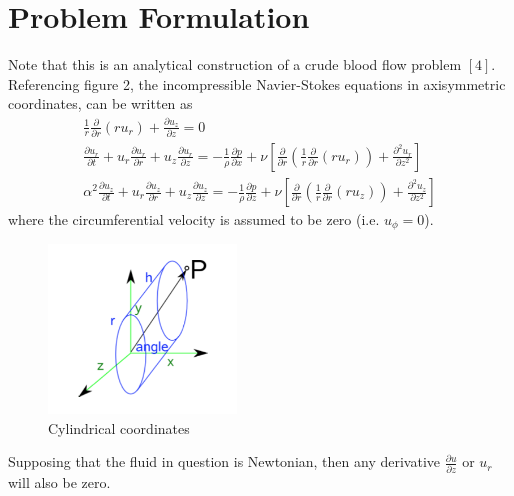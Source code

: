 \documentclass[12pt, a4paper]{article}
\theoremstyle{plain}
\theoremstyle{definition}
\theoremstyle{remark}
\begin{document}
\section{Problem Formulation}


Note that this is an analytical construction of a crude blood flow problem $[4]$. Referencing figure 2, the incompressible Navier-Stokes equations in axisymmetric coordinates, can be written as 
\begin{align}
\frac{1}{r}\frac{\partial}{\partial r} (ru_r) + \frac{\partial u_z}{\partial z} = 0 \\
\frac{\partial u_r}{\partial t} + u_r \frac{\partial u_r}{\partial r} + u_z \frac{\partial u_r}{\partial z} = -\frac{1}{\rho} \frac{\partial p}{\partial x} + \nu \left[  \frac{\partial}{\partial r} \left( \frac{1}{r} \frac{\partial}{\partial r} (ru_r)  \right) + \frac{\partial^2u_r}{\partial z^2}       \right]\\
\alpha^2\frac{\partial u_z}{\partial t} + u_r \frac{\partial u_z}{\partial r} + u_z \frac{\partial u_z}{\partial z} = -\frac{1}{\rho} \frac{\partial p}{\partial z} + \nu \left[  \frac{\partial}{\partial r} \left( \frac{1}{r} \frac{\partial}{\partial r} (ru_z)  \right) + \frac{\partial^2u_z}{\partial z^2}       \right]
\end{align}
where the circumferential velocity is assumed to be zero (i.e. $u_{\phi} = 0$). 

\begin{figure}[ht!]
\centering
\includegraphics[width=50mm]{cylindricalcoordinates.png}
\caption{Cylindrical coordinates}
\end{figure}



Supposing that the fluid in question is Newtonian, then any derivative $\frac{\partial u}{\partial z}$ or $u_r$ will also be zero.

\end{document}
